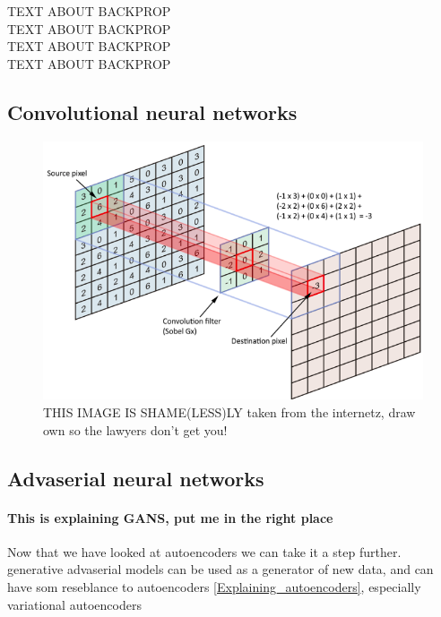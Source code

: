 	TEXT ABOUT BACKPROP\\
	TEXT ABOUT BACKPROP\\
	TEXT ABOUT BACKPROP\\
	TEXT ABOUT BACKPROP\\
	
    \subsection{Convolutional neural networks}
	\begin{figure}[ht!]
	    \centering
	    \includegraphics[scale=0.2]{background/figures/conv_neural_network.png}
	    \caption{THIS IMAGE IS SHAME(LESS)LY taken from the internetz, draw own so the lawyers don't get you!}
	\end{figure}
    
    \subsection{Advaserial neural networks}
  	  	\paragraph{This is explaining GANS, put me in the right place} %
	  Now that we have looked at autoencoders we can take it a step further. 
	  generative advaserial models can be used as a generator of new data, and can have som reseblance to autoencoders \ref{Explaining_autoencoders}, especially variational autoencoders %
	  
